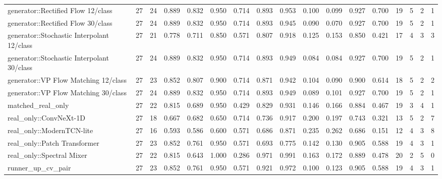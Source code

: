 \begin{table}[t]
\begin{tabular}{lrrrrrrrrrrrrrrrr}
generator::Rectified Flow 12/class & 27 & 24 & 0.889 & 0.832 & 0.950 & 0.714 & 0.893 & 0.953 & 0.100 & 0.099 & 0.927 & 0.700 & 19 & 5 & 2 & 1 \\
generator::Rectified Flow 30/class & 27 & 24 & 0.889 & 0.832 & 0.950 & 0.714 & 0.893 & 0.945 & 0.090 & 0.070 & 0.927 & 0.700 & 19 & 5 & 2 & 1 \\
generator::Stochastic Interpolant 12/class & 27 & 21 & 0.778 & 0.711 & 0.850 & 0.571 & 0.807 & 0.918 & 0.125 & 0.153 & 0.850 & 0.421 & 17 & 4 & 3 & 3 \\
generator::Stochastic Interpolant 30/class & 27 & 24 & 0.889 & 0.832 & 0.950 & 0.714 & 0.893 & 0.949 & 0.084 & 0.084 & 0.927 & 0.700 & 19 & 5 & 2 & 1 \\
generator::VP Flow Matching 12/class & 27 & 23 & 0.852 & 0.807 & 0.900 & 0.714 & 0.871 & 0.942 & 0.104 & 0.090 & 0.900 & 0.614 & 18 & 5 & 2 & 2 \\
generator::VP Flow Matching 30/class & 27 & 24 & 0.889 & 0.832 & 0.950 & 0.714 & 0.893 & 0.949 & 0.089 & 0.101 & 0.927 & 0.700 & 19 & 5 & 2 & 1 \\
matched\_real\_only & 27 & 22 & 0.815 & 0.689 & 0.950 & 0.429 & 0.829 & 0.931 & 0.146 & 0.166 & 0.884 & 0.467 & 19 & 3 & 4 & 1 \\
real\_only::ConvNeXt-1D & 27 & 18 & 0.667 & 0.682 & 0.650 & 0.714 & 0.736 & 0.917 & 0.200 & 0.197 & 0.743 & 0.321 & 13 & 5 & 2 & 7 \\
real\_only::ModernTCN-lite & 27 & 16 & 0.593 & 0.586 & 0.600 & 0.571 & 0.686 & 0.871 & 0.235 & 0.262 & 0.686 & 0.151 & 12 & 4 & 3 & 8 \\
real\_only::Patch Transformer & 27 & 23 & 0.852 & 0.761 & 0.950 & 0.571 & 0.693 & 0.775 & 0.142 & 0.130 & 0.905 & 0.588 & 19 & 4 & 3 & 1 \\
real\_only::Spectral Mixer & 27 & 22 & 0.815 & 0.643 & 1.000 & 0.286 & 0.971 & 0.991 & 0.163 & 0.172 & 0.889 & 0.478 & 20 & 2 & 5 & 0 \\
runner\_up\_cv\_pair & 27 & 23 & 0.852 & 0.761 & 0.950 & 0.571 & 0.921 & 0.972 & 0.100 & 0.123 & 0.905 & 0.588 & 19 & 4 & 3 & 1 \\
\bottomrule
\end{tabular}
\end{table}
